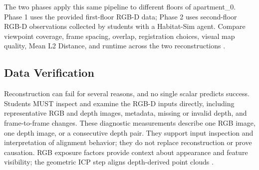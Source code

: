 \documentclass[11pt]{article}
\begin{document}
The two phases apply this same pipeline to different floors of apartment\_0. Phase 1 uses the provided first-floor RGB-D data; Phase 2 uses second-floor RGB-D observations collected by students with a Habitat-Sim agent. Compare viewpoint coverage, frame spacing, overlap, registration choices, visual map quality, Mean L2 Distance, and runtime across the two reconstructions \cite{habitatsim2020}.

\subsection{Data Verification}
Reconstruction can fail for several reasons, and no single scalar predicts success. Students MUST inspect and examine the RGB-D inputs directly, including representative RGB and depth images, metadata, missing or invalid depth, and frame-to-frame changes. These diagnostic measurements describe one RGB image, one depth image, or a consecutive depth pair. They support input inspection and interpretation of alignment behavior; they do not replace reconstruction or prove causation. RGB exposure factors provide context about appearance and feature visibility; the geometric ICP step aligns depth-derived point clouds \cite{shin2019camera,chen1992object}.
\end{document}
